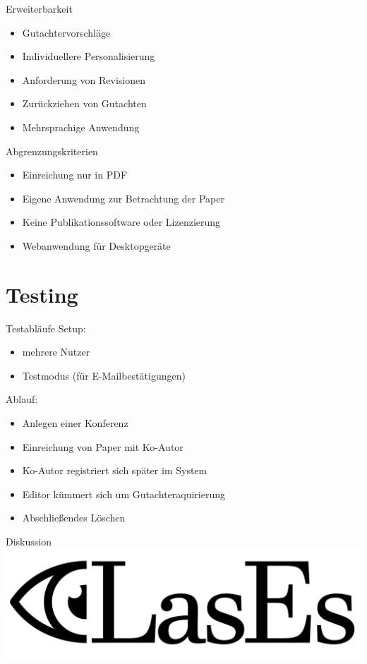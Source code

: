 \documentclass{beamer}
\begin{document}
\begin{frame}{Erweiterbarkeit}
	\pause
	\begin{itemize}
		\item Gutachtervorschläge
		\pause
		\item Individuellere Personalisierung
		\pause
		\item Anforderung von Revisionen
		\pause
		\item Zurückziehen von Gutachten
		\pause
		\item Mehrsprachige Anwendung
	\end{itemize}
\end{frame}

\begin{frame}{Abgrenzungskriterien}
	\pause
	\begin{itemize}
		\item Einreichung nur in PDF
		\pause
		\item Eigene Anwendung zur Betrachtung der Paper
		\pause
		\item Keine Publikationssoftware oder Lizenzierung
		\pause
		\item Webanwendung für Desktopgeräte
	\end{itemize}
\end{frame}

\section{Testing}
\begin{frame}{Testabläufe}
	\pause
	Setup:
	\begin{itemize}
		\item mehrere Nutzer
		\item Testmodus (für E-Mailbestätigungen)
	\end{itemize}

	\pause

	Ablauf:
	\begin{itemize}
		\item Anlegen einer Konferenz
		\item Einreichung von Paper mit Ko-Autor
		\item Ko-Autor registriert sich später im System
		\item Editor kümmert sich um Gutachteraquirierung
		\item Abschließendes Löschen
	\end{itemize}
\end{frame}

\begin{frame}{Diskussion}
	\centering
	\includegraphics[width=0.7\linewidth]{../../docs/Pflichtenheft/graphics/LasEs-logo}
\end{frame}
\end{document}
